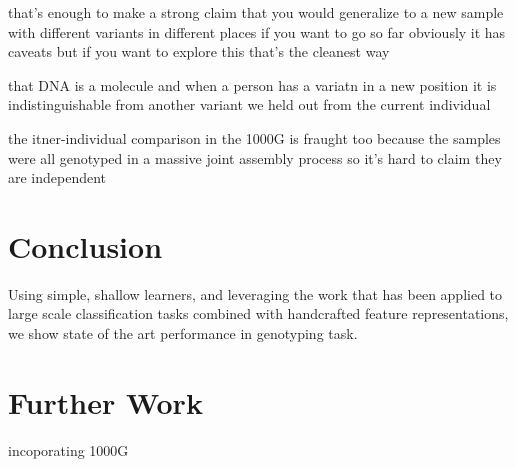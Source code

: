 \documentclass{article}
\begin{document}



that's enough to make a strong claim that you would generalize to a new sample with different variants in different places
if you want to go so far
obviously it has caveats but if you want to explore this that's the cleanest way

that DNA is a molecule and when a person has a variatn in a new position it is indistinguishable from another variant we held out from the current individual

the itner-individual comparison in the 1000G is fraught too
because the samples were all genotyped in a massive joint assembly process
so it's hard to claim they are independent

\section{Conclusion}

Using simple, shallow learners, and leveraging the work that has been applied to large scale classification tasks combined with handcrafted feature representations, we show state of the art performance in genotyping task.



\section{Further Work}
incoporating 1000G




\small



\end{document}

